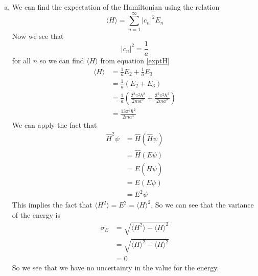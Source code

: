 \documentclass[11pt]{article}
\numberwithin{equation}{section}
\newcommand{\expt}[1]{\langle{#1}\rangle}
\begin{document}
\begin{enumerate}[(a)]
\item
We can find the expectation of the Hamiltonian using the relation
\begin{equation}
\expt{H} = \sum_{n=1}^{\infty}|c_n|^2E_n
\label{exptH}
\end{equation}
Now we see that 
$$|c_n|^2 = \frac{1}{a}$$
for all $n$ so we can find $\expt{H}$ from equation \ref{exptH}
\begin{align*}
\expt{H} &= \frac{1}{a}E_2+\frac{1}{a}E_3\\
&= \frac{1}{a}(E_2+E_3)\\
&= \frac{1}{a}\left(\frac{2^2\pi^2\hbar^2}{2ma^2}+\frac{3^2\pi^2\hbar^2}{2ma^2}\right)\\
&= \frac{13\pi^2\hbar^2}{2ma^3}
\end{align*}
We can apply the fact that
\begin{align*}
\hat{H}^2\psi &= \hat{H}(\hat{H}\psi)\\
&= \hat{H}(E\psi)\\
&= E(\hat{H}\psi)\\
&= E(E\psi)\\
&= E^2\psi
\end{align*}
This implies the fact that $\expt{H^2} = E^2 = \expt{H}^2$. So we can see that the variance of the energy is
\begin{align*}
\sigma_E &= \sqrt{\expt{H^2} -\expt{H}^2}\\
&= \sqrt{\expt{H}^2 -\expt{H}^2}\\
&= 0
\end{align*}
So we see that we have no uncertainty in the value for the energy.
\end{enumerate}
\end{document}
